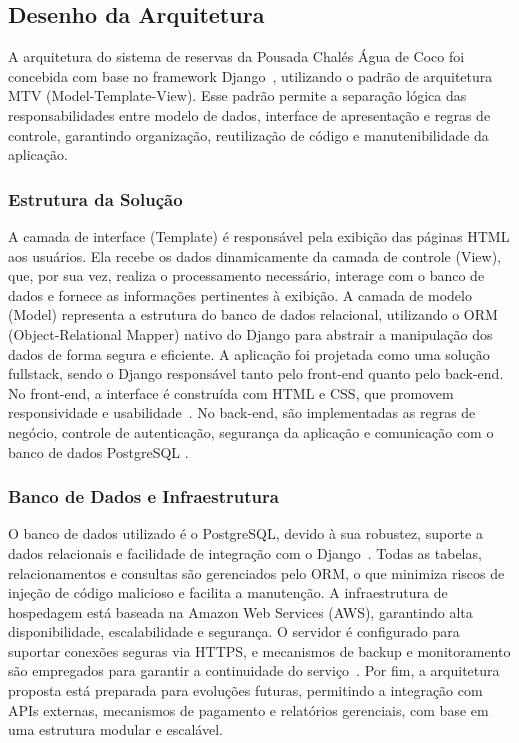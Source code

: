 \documentclass[
	12pt,				%
	openany,			%
	twoside,			%
	a4paper,			%
	english,			%
	french,				%
	spanish,			%
	brazil				%
	]{abntex2}
\begin{document}
\subsection{Desenho da Arquitetura}
A arquitetura do sistema de reservas da Pousada Chalés Água de Coco foi concebida com base no framework Django~\cite{django}, utilizando o padrão de arquitetura MTV (Model-Template-View). Esse padrão permite a separação lógica das responsabilidades entre modelo de dados, interface de apresentação e regras de controle, garantindo organização, reutilização de código e manutenibilidade da aplicação.

\subsubsection{Estrutura da Solução}

A camada de interface (Template) é responsável pela exibição das páginas HTML aos usuários. Ela recebe os dados dinamicamente da camada de controle (View), que, por sua vez, realiza o processamento necessário, interage com o banco de dados e fornece as informações pertinentes à exibição. A camada de modelo (Model) representa a estrutura do banco de dados relacional, utilizando o ORM (Object-Relational Mapper) nativo do Django para abstrair a manipulação dos dados de forma segura e eficiente.
A aplicação foi projetada como uma solução fullstack, sendo o Django responsável tanto pelo front-end quanto pelo back-end. No front-end, a interface é construída com HTML e CSS, que promovem responsividade e usabilidade~\cite{duckett}. No back-end, são implementadas as regras de negócio, controle de autenticação, segurança da aplicação e comunicação com o banco de dados PostgreSQL
.
\subsubsection{Banco de Dados e Infraestrutura}

O banco de dados utilizado é o PostgreSQL, devido à sua robustez, suporte a dados relacionais e facilidade de integração com o Django~\cite{postgresql}. Todas as tabelas, relacionamentos e consultas são gerenciados pelo ORM, o que minimiza riscos de injeção de código malicioso e facilita a manutenção.
A infraestrutura de hospedagem está baseada na Amazon Web Services (AWS), garantindo alta disponibilidade, escalabilidade e segurança. O servidor é configurado para suportar conexões seguras via HTTPS, e mecanismos de backup e monitoramento são empregados para garantir a continuidade do serviço~\cite{aws-doc}.
Por fim, a arquitetura proposta está preparada para evoluções futuras, permitindo a integração com APIs externas, mecanismos de pagamento e relatórios gerenciais, com base em uma estrutura modular e escalável.
\end{document}
